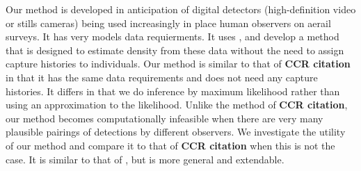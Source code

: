 \documentclass[useAMS, usenatbib, referee]{biom}
\begin{document}
Our method is developed in anticipation of digital detectors (high-definition video or stills cameras) being used increasingly in place human observers on aerail surveys. It has very models data requierments. It uses , and develop a method that is designed to estimate density from these data without the need to assign capture histories to individuals. 
Our method is similar to that of \textbf{CCR citation} in that it has the same data requirements and does not need any capture histories. It differs in that we do inference by maximum likelihood rather than using an approximation to the likelihood. Unlike the method of \textbf{CCR citation}, our method becomes computationally infeasible when there are very many plausible pairings of detections by different observers. We investigate the utility of our method and compare it to that of \textbf{CCR citation} when this is not the case. It is similar to that of \cite{Hiby+Lovell:98}, but is more general and extendable. %


\end{document}
